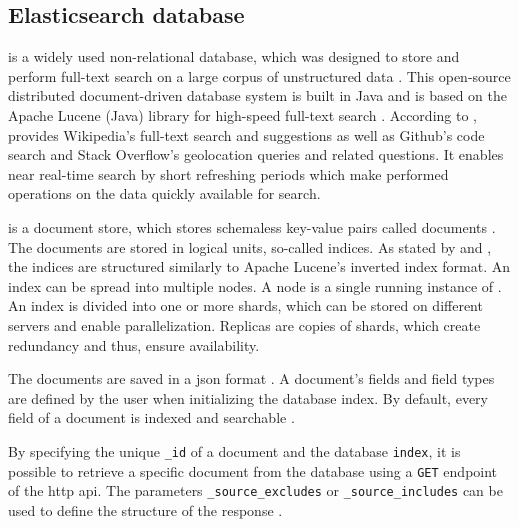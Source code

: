 
\subsection{Elasticsearch database}\label{sec:db}

\databaseName{} is a widely used non-relational database, which was designed to store and perform full-text search on a large corpus of unstructured data \cite{Elasticsearch2017}.
This open-source distributed document-driven database system is built in Java and is based on the Apache Lucene (Java) library for high-speed full-text search \cite{Elasticsearch2017, Elasticsearch2019}.
According to \citeauthor{Elasticsearch2019}, \databaseName{} provides Wikipedia's full-text search 
and suggestions as well as Github's code search and Stack Overflow's geolocation queries and related questions.
It enables near real-time search by short refreshing periods which make performed operations on the data quickly available for search.

\databaseName{} is a document store, which stores schemaless key-value pairs called documents \cite{flask2018}.
The documents are stored in logical units, so-called indices.
As stated by \citeauthor{Elasticsearch2019} and \citeauthor{Elasticsearch2017}, the indices are structured similarly to Apache Lucene's inverted index format.
An index can be spread into multiple nodes.
A node is a single running instance of \databaseName{} \cite{Elasticsearch2019}.
An index is divided into one or more shards, which can be stored on different servers and enable parallelization.
Replicas are copies of shards, which create redundancy and thus, ensure availability. %

The documents are saved in a \ac{json} format \cite{Elasticsearch2017}.
A document's fields and field types are defined by the user when initializing the database index.
By default, every field of a document is indexed and searchable \cite{Elasticsearch2019}.

By specifying the unique \texttt{\_id} of a document and the database \texttt{index}, 
it is possible to retrieve a specific document from the database using a \texttt{GET} endpoint of the \ac{http} \ac{api}.
The parameters \texttt{\_source\_excludes} or \texttt{\_source\_includes} can be used to define the structure of the response \cite{Elasticsearch-get}.

